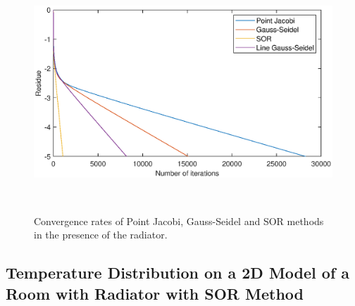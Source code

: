 \documentclass[letterpaper,12pt]{article}
\begin{document}
\begin{figure}[H] 
	\centering 
	\includegraphics[max height=9cm]{graphs/residual_SOR19_defaultrad.eps}
	\caption{Convergence rates of Point Jacobi, Gauss-Seidel and SOR methods in the presence of the radiator.}
 	\label{fig:convrad}
\end{figure}
\subsection{Temperature Distribution on a 2D Model of a Room with Radiator with SOR Method}
\end{document}
